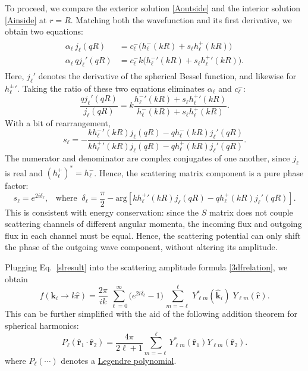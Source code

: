 \documentclass[pra,12pt]{revtex4}
\begin{document}
To proceed, we compare the exterior solution \eqref{Aoutside} and the
interior solution \eqref{Ainside} at $r = R$.  Matching both the
wavefunction and its first derivative, we obtain two equations:
\begin{align}
  \begin{aligned} \alpha_\ell\, j_\ell(qR) &= c^-_\ell \Big(h^-_\ell(kR) + s_\ell h^+_\ell(kR)\Big) \\ \alpha_\ell\, q j_\ell'(qR) &= c^-_\ell k \Big({h^-_\ell}'(kR) + s_\ell {h^+_\ell}'(kR)\Big).\end{aligned}
\end{align}
Here, $j_\ell'$ denotes the derivative of the spherical Bessel
function, and likewise for ${h_\ell^\pm}'$.  Taking the ratio of these
two equations eliminates $\alpha_\ell$ and $c_\ell^-$:
\begin{equation}
  \frac{q j_\ell'(qR)}{j_\ell(qR)} = k \frac{{h^-_\ell}'(kR) + s_\ell {h^+_\ell}'(kR)}{h^-_\ell(kR) + s_\ell h^+_\ell(kR)}.
\end{equation}
With a bit of rearrangement,
\begin{equation}
  s_\ell = - \frac{k{h_\ell^-}'(kR) j_\ell(qR) - qh_\ell^-(kR)j_\ell'(qR)}{k{h_\ell^+}'(kR) j_\ell(qR) - qh_\ell^+(kR)j_\ell'(qR)}.
\end{equation}
The numerator and denominator are complex conjugates of one another,
since $j_\ell$ is real and $(h_\ell^+)^* = h_\ell^-$.  Hence, the
scattering matrix component is a pure phase factor:
\begin{equation}
  s_\ell = e^{2i\delta_\ell}, \;\;\;\mathrm{where}\;\; \delta_\ell = \frac{\pi}{2} - \mathrm{arg}\!\left[k{h_\ell^+}'(kR) j_\ell(qR) - qh_\ell^+(kR)j_\ell'(qR)\right].
  \label{slresult}
\end{equation}
This is consistent with energy conservation: since the $S$ matrix does
not couple scattering channels of different angular momenta, the
incoming flux and outgoing flux in each channel must be equal.  Hence,
the scattering potential can only shift the phase of the outgoing wave
component, without altering its amplitude.

Plugging Eq.~\eqref{slresult} into the scattering amplitude formula
\eqref{3dfrelation}, we obtain
\begin{equation}
  f(\mathbf{k}_i\rightarrow k\hat{\mathbf{r}}) = \frac{2 \pi}{ik}\, \sum_{\ell =0}^\infty \big(e^{2i\delta_\ell} - 1\big) \, \sum_{m=-\ell}^\ell \,Y_{\ell m}^*(\hat{\mathbf{k}}_i)\; Y_{\ell m}(\hat{\mathbf{r}}).
\end{equation}
This can be further simplified with the aid of the following addition
theorem for spherical harmonics:
\begin{equation}
  P_\ell(\hat{\mathbf{r}}_1\cdot\hat{\mathbf{r}}_2) = \frac{4\pi}{2\ell+1} \sum_{m=-\ell}^{\ell} Y_{\ell m}^*(\hat{\mathbf{r}}_1) Y_{\ell m}(\hat{\mathbf{r}}_2).
\end{equation}
where $P_\ell(\cdots)$ denotes a
\href{https://en.wikipedia.org/wiki/Legendre_polynomials}{Legendre
  polynomial}.
\end{document}
